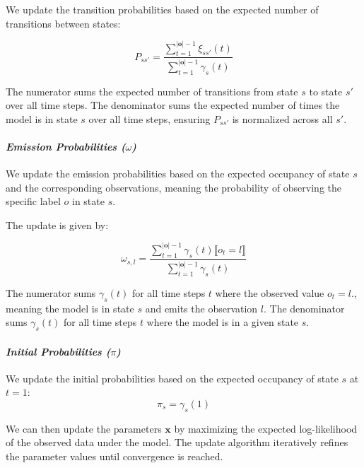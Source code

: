 We update the transition probabilities based on the expected number of transitions between states:


\begin{equation}
    P_{s s'} = \frac{\sum_{t = 1}^{|\mathbf{o}|-1} \xi_{ss'}(t)}{\sum_{t = 1}^{|\mathbf{o}|-1} \gamma_s(t)}
    \label{eq:transition-probabilities}
\end{equation}


The numerator sums the expected number of transitions from state $s$ to state $s'$ over all time steps.
The denominator sums the expected number of times the model is in state $s$ over all time steps, ensuring $P_{ss'}$ is normalized across all $s'$.

\paragraph*{\textit{Emission Probabilities ($\omega$)}}

We update the emission probabilities based on the expected occupancy of state $s$ and the corresponding observations, meaning the probability of observing the specific label $o$ in state $s$.

The update is given by:

\begin{equation}
    \omega_{s, l} = \frac{\sum_{t = 1}^{|\mathbf{o}|-1} \gamma_s(t) \lBrack o_t = l \rBrack}{\sum_{t = 1}^{|\mathbf{o}|-1} \gamma_s(t)}
    \label{eq:omega}
\end{equation}

The numerator sums $\gamma_s(t)$ for all time steps $t$ where the observed value $o_t = l$., meaning the model is in state $s$ and emits the observation $l$.
The denominator sums $\gamma_s(t)$ for all time steps $t$ where the model is in a given state $s$.


\paragraph*{\textit{Initial Probabilities ($\pi$)}}

We update the initial probabilities based on the expected occupancy of state $s$ at $t = 1$:
\begin{equation}
    \pi_s = \gamma_s(1)
    \label{eq:initial-probabilities}
\end{equation}

We can then update the parameters $\mathbf{x}$ by maximizing the expected log-likelihood of the observed data under the model.
The update algorithm iteratively refines the parameter values until convergence is reached.

